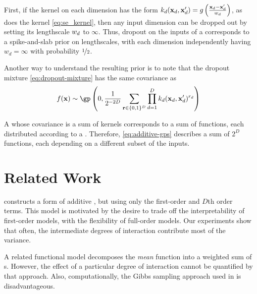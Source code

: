 First, if the kernel on each dimension has the form ${k_d({\bf{x}}_d, {\bf{x}}_d') = g \left( \frac{{\bf{x}}_d - {\bf{x}}_d'}{w_d} \right)}$, as does the  kernel \eqref{eq:se_kernel}, then any input dimension can be dropped out by setting its lengthscale $w_d$ to $\infty$.
Thus, dropout on the inputs of a \gp{} corresponds to a spike-and-slab prior on lengthscales, with each dimension independently having $w_d = \infty$ with probability $\nicefrac{1}{2}$.

Another way to understand the resulting prior is to note that the dropout mixture \eqref{eq:dropout-mixture} has the same covariance as
\begin{align}
f(\vx) \sim \textnormal{\gp} \left(0, \frac{1}{2^{-2D}} \sum_{\vr \in \{0,1\}^D}  \prod_{d=1}^D k_d(\vx_d, \vx_d')^{r_d} \right)
\label{eq:additive-gps}
\end{align}

A \gp{} whose covariance is a sum of kernels corresponds to a sum of functions, each distributed according to a \gp{}.  Therefore, \eqref{eq:additive-gps} describes a sum of $2^D$ functions, each depending on a different subset of the inputs.



\section{Related Work}

\citet{plate1999accuracy} constructs a form of additive \gp{}, but using only the first-order and $D$th order terms.
This model is motivated by the desire to trade off the interpretability of first-order models, with the flexibility of full-order models.
Our experiments show that often, the intermediate degrees of interaction contribute most of the variance.

A related functional \ANOVA{} \gp{} model \citep{kaufman2010bayesian} decomposes the \emph{mean} function into a weighted sum of \gp{}s.
However, the effect of a particular degree of interaction cannot be quantified by that approach.
Also, computationally, the Gibbs sampling approach used in \cite{kaufman2010bayesian} is disadvantageous.

